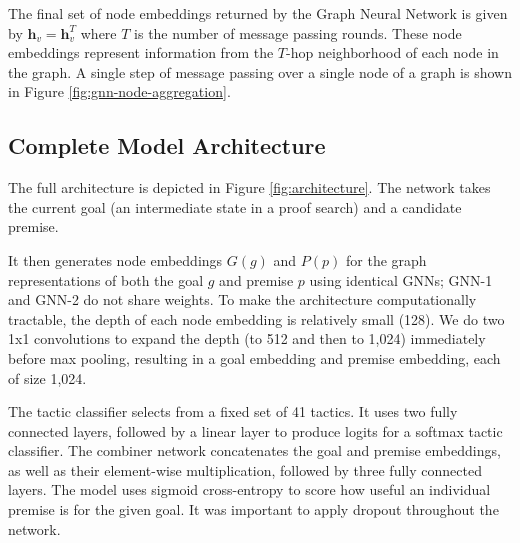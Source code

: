\documentclass[letterpaper]{article} \usepackage{aaai20}  \usepackage{times}  \usepackage{helvet} \usepackage{courier}  \usepackage[hyphens]{url}  \usepackage{graphicx} \urlstyle{rm} \def\UrlFont{\rm}  \usepackage{graphicx}  \frenchspacing  \setlength{\pdfpagewidth}{8.5in}  \setlength{\pdfpageheight}{11in}
\begin{document}
The final set of node embeddings returned by the Graph Neural Network is given by $\bm{h}_v = \bm{h}_v^T$ where $T$ is the number of message passing rounds. These node embeddings represent information from the $T$-hop neighborhood of each node in the graph. A single step of message passing over a single node of a graph is shown in Figure \ref{fig:gnn-node-aggregation}.


\subsection{Complete Model Architecture}
\label{sec:full_model}

The full architecture is depicted in Figure \ref{fig:architecture}. 
The network takes the current goal (an intermediate state in a proof search) and a candidate premise.

It then generates node embeddings $G(g)$ and $P(p)$ for the graph representations of both the goal $g$ and premise $p$ using identical GNNs; GNN-1 and GNN-2 do not share weights.
To make the architecture computationally tractable, the depth of each node embedding is relatively small (128). 
We do two 1x1 convolutions to expand the depth (to 512 and then to 1,024) immediately before max pooling, resulting in a goal embedding and premise embedding, each of size 1,024. 

The tactic classifier selects from a fixed set of 41 tactics.
It uses two fully connected layers, followed by a linear layer to produce logits for a softmax tactic classifier.
The combiner network concatenates the goal and premise embeddings, as well as their element-wise multiplication, followed by three fully connected layers.
The model uses sigmoid cross-entropy to score how useful an individual premise is for the given goal. It was important to apply dropout throughout the network.
\end{document}
